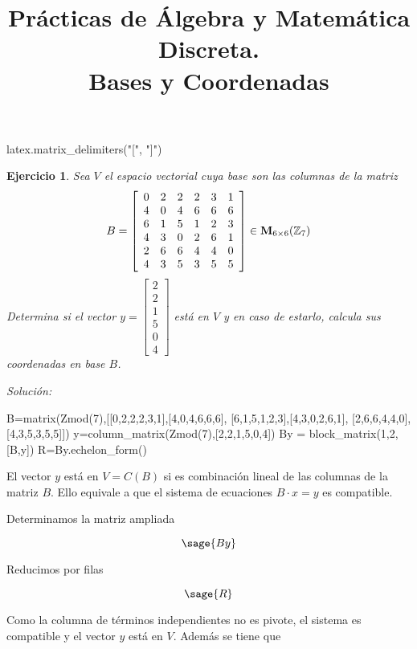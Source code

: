 \documentclass{amsart}
\title{Pr\'acticas de \'Algebra y Matem\'atica Discreta. \\ Bases y Coordenadas}
\newtheorem{ejer}{Ejercicio}
\begin{document}
\maketitle

\begin{sageblock}
latex.matrix_delimiters("[", "]")
\end{sageblock}

\begin{ejer} Sea $V$ el espacio vectorial cuya base son las columnas de la matriz
\[ B = \left[\begin{array}{rrrrrr}
0 & 2 & 2 & 2 & 3 & 1 \\
4 & 0 & 4 & 6 & 6 & 6 \\
6 & 1 & 5 & 1 & 2 & 3 \\
4 & 3 & 0 & 2 & 6 & 1 \\
2 & 6 & 6 & 4 & 4 & 0 \\
4 & 3 & 5 & 3 & 5 & 5
\end{array}\right] \in {\bf M}_{6 \times 6}({\mathbb Z}_{7})\]
Determina si el vector $y = {\left[\begin{array}{r}
2 \\
2 \\
1 \\
5 \\
0 \\
4
\end{array}\right]}$ est\'a en $V$ y en caso de estarlo, calcula sus coordenadas 
en base $B$.
\end{ejer}

{\it Soluci\'on:}

\begin{sageblock}
B=matrix(Zmod(7),[[0,2,2,2,3,1],[4,0,4,6,6,6],
[6,1,5,1,2,3],[4,3,0,2,6,1],
[2,6,6,4,4,0],[4,3,5,3,5,5]])
y=column_matrix(Zmod(7),[2,2,1,5,0,4])
By = block_matrix(1,2,[B,y])
R=By.echelon_form()
\end{sageblock}

El vector $y$ está en $V=C(B)$ si es combinación lineal de las columnas de la 
matriz $B$. Ello equivale a que el sistema de ecuaciones $B\cdot x = y$ es compatible.

Determinamos la matriz ampliada

$$ \sage{By} $$

Reducimos por filas

$$ \sage{R} $$

Como la columna de términos independientes no es pivote, el sistema es compatible 
y el vector $y$ está en $V$. Además se tiene que
\end{document}
